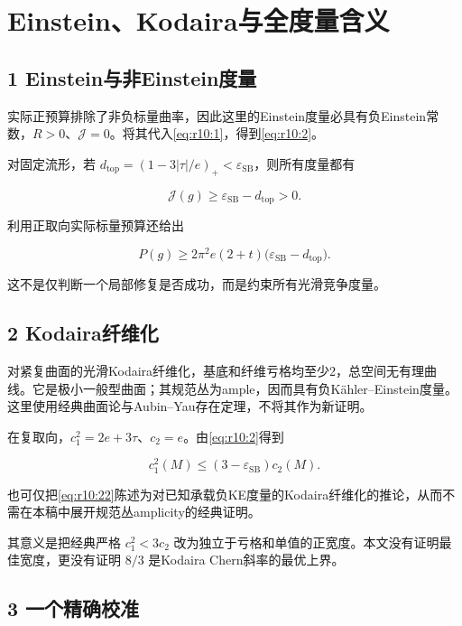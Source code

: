 \documentclass[UTF8,11pt,openany,oneside,fontset=none]{ctexbook}
\begin{document}
\section{Einstein、Kodaira与全度量含义}\label{ch10:einsteinkodairaux4e0eux5168ux5ea6ux91cfux542bux4e49}

\subsection{1 Einstein与非Einstein度量}\label{ch10:einsteinux4e0eux975eeinsteinux5ea6ux91cf}

实际正预算排除了非负标量曲率，因此这里的Einstein度量必具有负Einstein常数，\(R>0\)、\(\mathcal J=0\)。将其代入\eqref{eq:r10:1}，得到\eqref{eq:r10:2}。

对固定流形，若 \(d_{\mathrm{top}}=(1-3|\tau|/e)_+<\varepsilon_{\mathrm{SB}}\)，则所有度量都有

\[
\mathcal J(g)\ge\varepsilon_{\mathrm{SB}}-d_{\mathrm{top}}>0.
\]

利用正取向实际标量预算还给出

\[
P(g)\ge2\pi^2 e(2+t)
\bigl(\varepsilon_{\mathrm{SB}}-d_{\mathrm{top}}\bigr).
\]

这不是仅判断一个局部修复是否成功，而是约束所有光滑竞争度量。

\subsection{2 Kodaira纤维化}\label{ch10:kodairaux7ea4ux7ef4ux5316}

对紧复曲面的光滑Kodaira纤维化，基底和纤维亏格均至少2，总空间无有理曲线。它是极小一般型曲面；其规范丛为ample，因而具有负Kähler--Einstein度量。这里使用经典曲面论与Aubin--Yau存在定理，不将其作为新证明。

在复取向，\(c_1^2=2e+3\tau\)、\(c_2=e\)。由\eqref{eq:r10:2}得到

\[
\boxed{c_1^2(M)\le(3-\varepsilon_{\mathrm{SB}})c_2(M).}
\tag{10.22}\label{eq:r10:22}
\]

也可仅把\eqref{eq:r10:22}陈述为对已知承载负KE度量的Kodaira纤维化的推论，从而不需在本稿中展开规范丛amplicity的经典证明。

其意义是把经典严格 \(c_1^2<3c_2\) 改为独立于亏格和单值的正宽度。本文没有证明最佳宽度，更没有证明 \(8/3\) 是Kodaira Chern斜率的最优上界。

\subsection{3 一个精确校准}\label{ch10:ux4e00ux4e2aux7cbeux786eux6821ux51c6}
\end{document}
